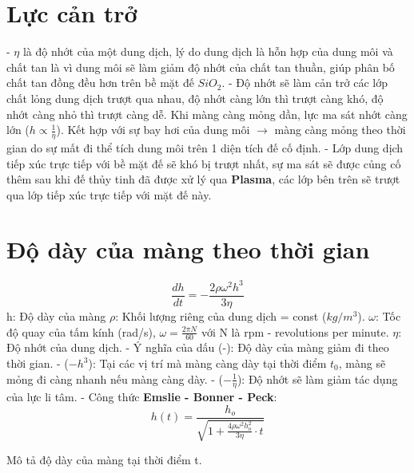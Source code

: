 \documentclass{article}
\begin{document}
\section{Lực cản trở}
- $\eta$ là độ nhớt của một dung dịch, lý do dung dịch là hỗn hợp của dung môi và chất tan là vì dung môi sẽ làm giảm độ nhớt của chất tan thuần, giúp phân bố chất tan đồng đều hơn trên bề mặt đế $SiO_2$. \newline
- Độ nhớt sẽ làm cản trở các lớp chất lỏng dung dịch trượt qua nhau, độ nhớt càng lớn thì trượt càng khó, độ nhớt càng nhỏ thì trượt càng dễ. Khi màng càng mỏng dần, lực ma sát nhớt càng lớn ($h \propto \frac{1}{\eta}$). Kết hợp với sự bay hơi của dung môi $\longrightarrow$ màng càng mỏng theo thời gian do sự mất đi thể tích dung môi trên 1 diện tích đế cố định. \newline
- Lớp dung dịch tiếp xúc trực tiếp với bề mặt đế sẽ khó bị trượt nhất, sự ma sát sẽ được củng cố thêm sau khi đế thủy tinh đã được xử lý qua \textbf{Plasma}, các lớp bên trên sẽ trượt qua lớp tiếp xúc trực tiếp với mặt đế này.

\section{Độ dày của màng theo thời gian}
\[\frac{dh}{dt}=-\frac{2 \rho \omega^2 h^3}{3\eta}\]
h: Độ dày của màng \newline
$\rho$: Khối lượng riêng của dung dịch = const ($kg/m^3$). \newline
$\omega$: Tốc độ quay của tấm kính (rad/s), $\omega = \frac{2\pi N}{60}$ với N là rpm - revolutions per minute.\newline
$\eta$: Độ nhớt của dung dịch.\newline
- Ý nghĩa của dấu (-): Độ dày của màng giảm đi theo thời gian. \newline
- ($-h^3$): Tại các vị trí mà màng càng dày tại thời điểm $t_0$, màng sẽ mỏng đi càng nhanh nếu màng càng dày. \newline
- ($-\frac{1}{\eta}$): Độ nhớt sẽ làm giảm tác dụng của lực li tâm. \newline
- Công thức\textbf{ Emslie - Bonner - Peck}: 
\[h(t)=\frac{h_o}{\sqrt{1+\frac{4 \rho \omega^2 h_o^2}{3\eta}\cdot t}}\]
\begin{center}
    Mô tả độ dày của màng tại thời điểm t.
\end{center}
\end{document}
